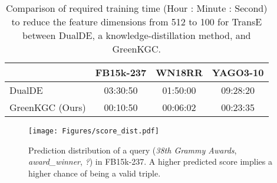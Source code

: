 \documentclass{article}
\begin{document}
\begin{table}[t]
\setlength\tabcolsep{3pt}
\centering
\begin{tabular}{l | c | c | c}
\hline
& \textbf{FB15k-237} & \textbf{WN18RR} & \textbf{YAGO3-10} \\
\hline
DualDE   & 03:30:50 & 01:50:00 & 09:28:20 \\
GreenKGC (Ours) & 00:10:50 & 00:06:02 & 00:23:35 \\
\hline
\end{tabular}
\caption{Comparison of required training time (Hour : Minute : Second) to 
reduce the feature dimensions from 512 to 100 for TransE 
between DualDE, a knowledge-distillation method, and GreenKGC.}
\label{tab:reduction_time}
\end{table}


\begin{table*}[t]
\setlength\tabcolsep{3pt}
\centering
{}
\caption{Comparison on performance, number of model parameters, and
total inference time (batch size = 8) with other classification-based methods in 128
dimensions. We adopt TransE as the baseline for fair 
comparison in the number of model parameters. The best numbers are in bold.} 
\label{tab:cls}
\end{table*}


\begin{figure}[t]
\centering
\texttt{[image: Figures/score\_dist.pdf]}
\caption{Prediction distribution of a query (\emph{38th Grammy Awards}, \emph{award\_winner}, \emph{?}) in FB15k-237. A higher predicted score implies a higher chance of being a valid triple. }
\label{fig:distribution}
\end{figure}
\end{document}
